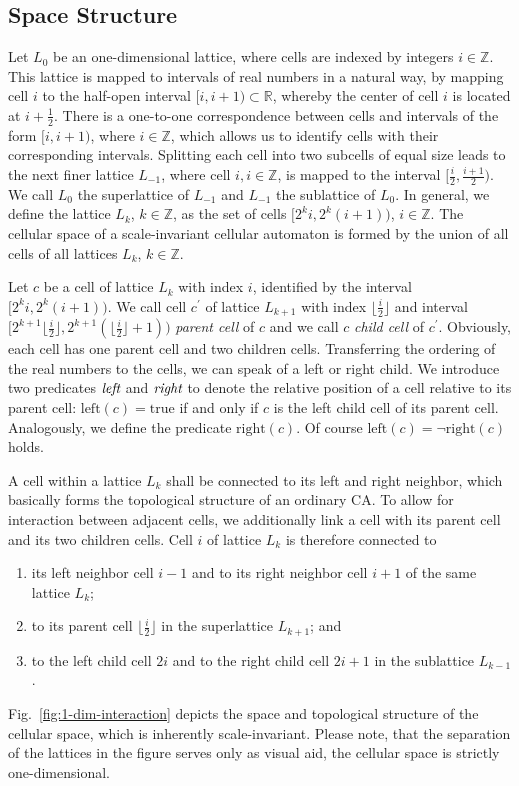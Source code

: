 \documentclass[pre,amssymb,showpacs,showkeys,preprint]{revtex4}
\begin{document}
\subsection{Space Structure}

Let $L_0$ be an one-dimensional lattice, where cells are indexed by integers $i \in \mathbb Z$.
This lattice is mapped to intervals of real numbers in a natural way, by mapping cell $i$ to the
half-open interval $[i, i+1) \subset \mathbb R$, whereby the center of cell $i$ is located at
$i + \frac{1}{2}$.
There is a one-to-one correspondence between cells and intervals of the form
$[i, i+1)$, where $i \in \mathbb Z$, which allows us to identify cells with their corresponding
intervals.
Splitting each cell into two subcells of equal size leads to the next finer lattice $L_{-1}$, where
cell $i, i \in \mathbb Z$, is mapped to the interval $[\frac{i}{2}, \frac{i+1}{2})$.
We call $L_0$ the superlattice of $L_{-1}$ and $L_{-1}$ the sublattice of $L_0$.
In general, we define the lattice $L_k$, $k \in \mathbb Z$, as the set of cells $[2^ki, 2^k(i+1))$,
$i \in \mathbb Z$.
The cellular space of a scale-invariant cellular automaton is formed by the union of all cells of
all lattices $L_k$, $k \in \mathbb Z$.

Let $c$ be a cell of lattice $L_k$ with index $i$, identified by the interval $[2^ki, 2^k(i+1))$.
We call cell $c^\prime$ of lattice $L_{k+1}$ with index $\lfloor \frac{i}{2} \rfloor$ and interval
$[2^{k+1}\lfloor \frac{i}{2} \rfloor, 2^{k+1}(\lfloor \frac{i}{2} \rfloor+1))$ \emph{parent cell}
of $c$ and we call $c$ \emph{child cell} of $c^\prime$.
Obviously, each cell has one parent cell and two children cells.
Transferring the ordering of the real numbers to the cells, we can speak of a left or right
child.
We introduce two predicates $\emph{left}$ and $\emph{right}$ to denote the relative position of a
cell relative to its parent cell:
$\mbox{left}(c) = \mbox{true}$ if and only if $c$ is the left child cell of its parent cell.
Analogously, we define the predicate $\mbox{right}(c)$.
Of course $\mbox{left}(c) = \neg \mbox{right}(c)$ holds.

A cell within a lattice $L_k$ shall be connected to its left and right neighbor, which basically
forms the topological structure of an ordinary CA.
To allow for interaction between adjacent cells, we additionally link a cell with its parent cell
and its two children cells.
Cell $i$ of lattice $L_k$ is therefore connected to
\begin{enumerate}
\item its left neighbor cell $i-1$ and to its right neighbor cell $i+1$ of the same lattice $L_k$;
\item to its parent cell $\lfloor \frac{i}{2} \rfloor$ in the superlattice $L_{k+1}$; and
\item to the left child cell $2i$ and to the right child cell $2i+1$ in the sublattice $L_{k-1}$.
\end{enumerate}
Fig.~\ref{fig:1-dim-interaction} depicts the space and
topological structure of the cellular space, which is inherently scale-invariant.
Please note, that the separation of the lattices in the figure serves only as visual aid, the
cellular space is strictly one-dimensional.
\end{document}
